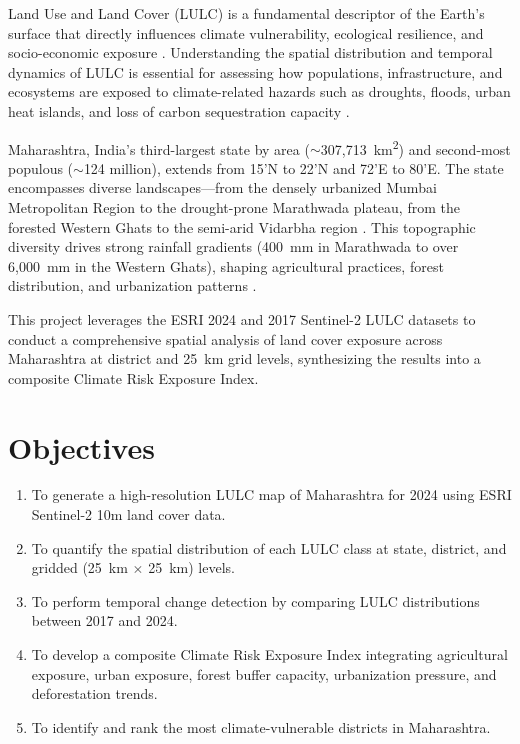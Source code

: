 \documentclass[12pt,a4paper]{article}
\begin{document}
Land Use and Land Cover (LULC) is a fundamental descriptor of the Earth's surface that directly influences climate vulnerability, ecological resilience, and socio-economic exposure \citep{foley2005global}. Understanding the spatial distribution and temporal dynamics of LULC is essential for assessing how populations, infrastructure, and ecosystems are exposed to climate-related hazards such as droughts, floods, urban heat islands, and loss of carbon sequestration capacity \citep{ipcc2022}.

Maharashtra, India's third-largest state by area ($\sim$307,713~km\textsuperscript{2}) and second-most populous ($\sim$124 million), extends from 15'N to 22'N and 72'E to 80'E. The state encompasses diverse landscapes---from the densely urbanized Mumbai Metropolitan Region to the drought-prone Marathwada plateau, from the forested Western Ghats to the semi-arid Vidarbha region \citep{maharashtra2023}. This topographic diversity drives strong rainfall gradients (400~mm in Marathwada to over 6,000~mm in the Western Ghats), shaping agricultural practices, forest distribution, and urbanization patterns \citep{gadgil1992western}.

This project leverages the ESRI 2024 and 2017 Sentinel-2 LULC datasets \citep{karra2021global} to conduct a comprehensive spatial analysis of land cover exposure across Maharashtra at district and 25~km grid levels, synthesizing the results into a composite Climate Risk Exposure Index.

\section{Objectives}

\begin{enumerate}[leftmargin=2cm]
    \item To generate a high-resolution LULC map of Maharashtra for 2024 using ESRI Sentinel-2 10m land cover data.
    \item To quantify the spatial distribution of each LULC class at state, district, and gridded (25~km $\times$ 25~km) levels.
    \item To perform temporal change detection by comparing LULC distributions between 2017 and 2024.
    \item To develop a composite Climate Risk Exposure Index integrating agricultural exposure, urban exposure, forest buffer capacity, urbanization pressure, and deforestation trends.
    \item To identify and rank the most climate-vulnerable districts in Maharashtra.
\end{enumerate}
\end{document}
